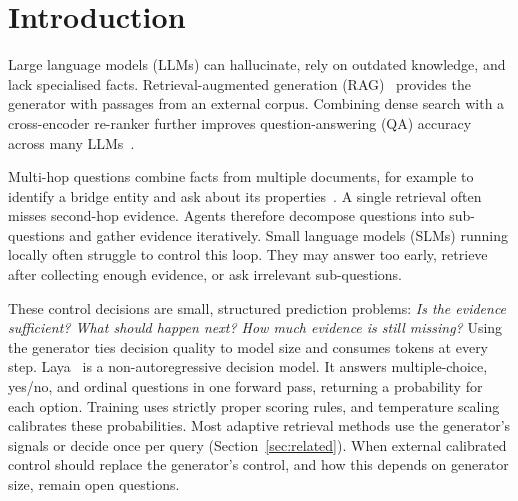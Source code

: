 \section{Introduction}
\label{sec:intro}

Large language models (LLMs) can hallucinate, rely on outdated knowledge, and lack
specialised facts. Retrieval-augmented generation (RAG)~\cite{lewis2020rag} provides
the generator with passages from an external corpus. Combining dense search with a
cross-encoder re-ranker further improves question-answering (QA) accuracy across many
LLMs~\cite{yang2025enhancing}.

Multi-hop questions combine facts from multiple documents, for example to identify a
bridge entity and ask about its
properties~\cite{yang2018hotpotqa,ho2020twowiki,trivedi2022musique}. A single retrieval
often misses second-hop evidence. Agents therefore decompose questions into sub-questions
and gather evidence iteratively. Small language models (SLMs) running locally often struggle to
control this loop. They may answer too early, retrieve after collecting enough evidence,
or ask irrelevant sub-questions.

These control decisions are small, structured prediction problems: \emph{Is the evidence
sufficient? What should happen next? How much evidence is still missing?} Using the
generator ties decision quality to model size and consumes tokens at every
step. Laya~\cite{laya} is a non-autoregressive  decision model. It answers
multiple-choice, yes/no, and ordinal questions in one forward pass, returning a
probability for each option. Training uses strictly proper scoring rules, and temperature
scaling calibrates these probabilities. Most adaptive retrieval methods use the
generator's signals or decide once per query (Section~\ref{sec:related}). When external
calibrated control should replace the generator's control, and how this depends on
generator size, remain open questions.

